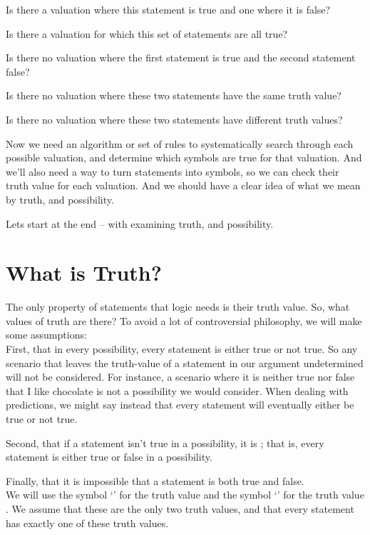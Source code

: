 \documentclass[PHIL101-Textbook.tex]{subfiles}
\begin{document}
\begin{earg}
\item Is there a valuation where this statement is true and one where it is false?
\item Is there a valuation for which this set of statements are all true?
\item Is there no valuation where the first statement is true and the second statement false?
\item Is there no valuation where these two statements have the same truth value?
\item Is there no valuation where these two statements have different truth values?
\end{earg}

Now we need an algorithm or set of rules to systematically search through each possible valuation, and determine which symbols are true for that valuation. And we'll also need a way to turn statements into symbols, so we can check their truth value for each valuation. And we should have a clear idea of what we mean by truth, and possibility.

Lets start at the end -- with examining truth, and possibility.




\section{What is Truth?}
The only property of statements that logic needs is their truth value. So, what values of truth are there? To avoid a lot of controversial philosophy, we will make some assumptions:\\

First, that in every possibility, every statement is either true or not true. 
 So any scenario that leaves the truth-value of a statement in our argument undetermined will not be considered. For instance, a scenario where it is neither true nor false that I like chocolate is not a possibility we would consider. When dealing with predictions, we might say instead that every statement will eventually either be true or not true. 

Second, that if a statement isn't true in a possibility, it is ; that is, every statement is either true or false in a possibility.

Finally, that it is impossible that a statement is both true and false.\\

We will use the symbol `\vT' for the truth value  and the symbol `\vF' for the truth value . We assume that these are the only two truth values, and that every statement has exactly one of these truth values.
\end{document}
